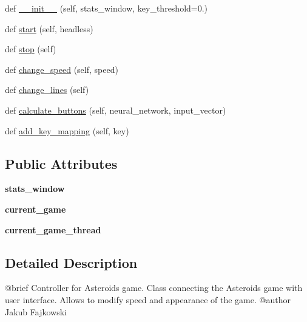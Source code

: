 \begin{DoxyCompactItemize}
\item 
def \hyperlink{classGameController_1_1GameController_a8e0ebfe57e0c1850047d4f271e296187}{\+\_\+\+\_\+init\+\_\+\+\_\+} (self, stats\+\_\+window, key\+\_\+threshold=0.)
\item 
def \hyperlink{classGameController_1_1GameController_a000e1b43edbc5454673763a491f53d27}{start} (self, headless)
\item 
def \hyperlink{classGameController_1_1GameController_adceb4b825410df4ac33c63732c5ebb1c}{stop} (self)
\item 
def \hyperlink{classGameController_1_1GameController_a6e9c793d9f9c7f91ef86fdfbad1f399c}{change\+\_\+speed} (self, speed)
\item 
def \hyperlink{classGameController_1_1GameController_a6df31616562721415f855506ac39200e}{change\+\_\+lines} (self)
\item 
def \hyperlink{classGameController_1_1GameController_adfa21a1d6a41248487a720c5311eb5c7}{calculate\+\_\+buttons} (self, neural\+\_\+network, input\+\_\+vector)
\item 
def \hyperlink{classGameController_1_1GameController_a7828e77aa375bd536fe94f502cf177e5}{add\+\_\+key\+\_\+mapping} (self, key)
\end{DoxyCompactItemize}
\subsection*{Public Attributes}
\begin{DoxyCompactItemize}
\item 
{\bfseries stats\+\_\+window}\hypertarget{classGameController_1_1GameController_a2a1ba0465b97db6b05716e321f778a8d}{}\label{classGameController_1_1GameController_a2a1ba0465b97db6b05716e321f778a8d}

\item 
{\bfseries current\+\_\+game}\hypertarget{classGameController_1_1GameController_aa9126bcbf2b35e3f5216409e8e27451f}{}\label{classGameController_1_1GameController_aa9126bcbf2b35e3f5216409e8e27451f}

\item 
{\bfseries current\+\_\+game\+\_\+thread}\hypertarget{classGameController_1_1GameController_acf065316475a9b63dcd44ddb367acf45}{}\label{classGameController_1_1GameController_acf065316475a9b63dcd44ddb367acf45}

\end{DoxyCompactItemize}


\subsection{Detailed Description}
\begin{DoxyVerb}@brief Controller for Asteroids game.
Class connecting the Asteroids game with user interface. Allows to modify speed and appearance of the game.
@author Jakub Fajkowski
\end{DoxyVerb}
 

